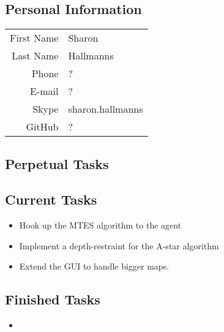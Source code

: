 \subsection{Personal Information}
\begin{table}[h!]
	\begin{tabular}{rl}
	First Name 	& Sharon\\
	Last Name	& Hallmanns\\
	Phone		& ?\\
	E-mail		& ?\\
	Skype		& sharon.hallmanns\\
	GitHub		& ?
\end{tabular}
\end{table}

\subsection{Perpetual Tasks}

\subsection{Current Tasks}
\begin{itemize}
	\item Hook up the MTES algorithm to the agent
	\item Implement a depth-restraint for the A-star algorithm
	\item Extend the GUI to handle bigger maps.
\end{itemize}

\subsection{Finished Tasks}
\begin{itemize}
	\item
\end{itemize}